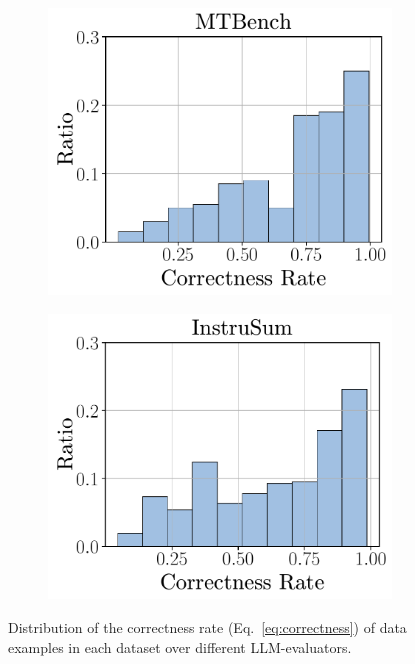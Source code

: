 \documentclass[11pt]{article}
\begin{document}
\begin{figure}[t!]
    \begin{subfigure}[b]{0.24\linewidth}
        \centering
        \includegraphics[width=\linewidth]{figures/correctness_rate_mtbench.pdf}
    \end{subfigure}
    \hfill
    \begin{subfigure}[b]{0.24\linewidth}
        \centering
        \includegraphics[width=\linewidth]{figures/correctness_rate_instrusum_acc.pdf}
    \end{subfigure}
    \hfill
    \vspace{-1mm}
    \caption{Distribution of the correctness rate (Eq.~\ref{eq:correctness}) of data examples in each dataset over different LLM-evaluators.}
    \label{fig:correctness-rate}
\end{figure}
\end{document}
